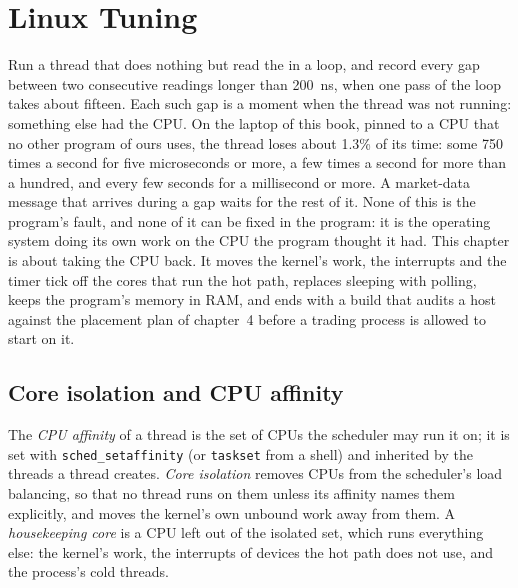 \chapter{Linux Tuning}\label{ch:ll:linux-tuning}

Run a thread that does nothing but read the  in a loop, and record every gap between two consecutive
readings longer than \qty{200}{\nano\second}, when one pass of the loop takes about fifteen. Each such gap is a moment when
the thread was not running: something else had the CPU. On the laptop of this book, pinned to a CPU that no other program
of ours uses, the thread loses about 1.3\% of its time: some 750 times a second for five microseconds or more, a few
times a second for more than a hundred, and every few seconds for a millisecond or more. A market-data
message that arrives during a gap waits for the rest of it. None of this is the program's fault, and none of it can be
fixed in the program: it is the operating system doing its own work on the CPU the program thought it had. This chapter is
about taking the CPU back. It moves the kernel's work, the interrupts and the timer tick off the cores that run the hot
path, replaces sleeping with polling, keeps the program's memory in RAM, and ends with a build that audits a host against
the placement plan of chapter~4 before a trading process is allowed to start on it.

\section{Core isolation and CPU affinity}

\begin{definition}\label{def:ll:linux-tuning:isolation}
The \emph{CPU affinity} of a thread is the set of CPUs the scheduler may run it on; it is set with
\texttt{sched\_setaffinity} (or \texttt{taskset} from a shell) and inherited by the threads a thread creates. \emph{Core
isolation} removes CPUs from the scheduler's load balancing, so that no thread runs on them unless its
affinity names them explicitly, and moves the kernel's own unbound work away from them. A \emph{housekeeping
core} is a CPU left out of the isolated set, which runs everything else: the kernel's work, the
interrupts of devices the hot path does not use, and the process's cold threads.
\end{definition}

